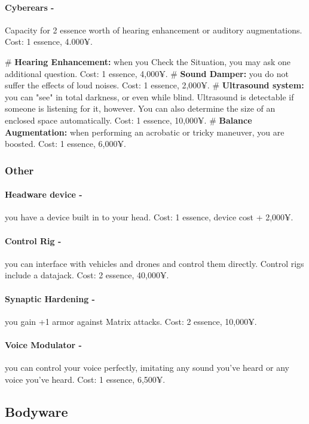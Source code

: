 \paragraph{Cyberears -} Capacity for 2 essence worth of hearing enhancement or auditory augmentations. Cost: 1 essence, 4.000¥.

\begin{easylist}
    # \textbf{Hearing Enhancement:} when you Check the Situation, you may ask one additional question. Cost: 1 essence, 4,000¥.
    # \textbf{Sound Damper:} you do not suffer the effects of loud noises. Cost: 1 essence, 2,000¥.
    # \textbf{Ultrasound system:} you can "see" in total darkness, or even while blind. Ultrasound is detectable if someone is listening for it, however. You can also determine the size of an enclosed space automatically. Cost: 1 essence, 10,000¥.    
    # \textbf{Balance Augmentation:} when performing an acrobatic or tricky maneuver, you are boosted. Cost: 1 essence, 6,000¥.
\end{easylist}


\subsubsection{Other}
\paragraph{Headware device -} you have a device built in to your head. Cost: 1 essence, device cost + 2,000¥.

\paragraph{Control Rig -} you can interface with vehicles and drones and control them directly. Control rigs include a datajack. Cost: 2 essence, 40,000¥.

\paragraph{Synaptic Hardening -} you gain +1 armor against Matrix attacks. Cost: 2 essence, 10,000¥.

\paragraph{Voice Modulator -} you can control your voice perfectly, imitating any sound you’ve heard or any voice you’ve heard. Cost: 1 essence, 6,500¥.


\subsection{Bodyware}

